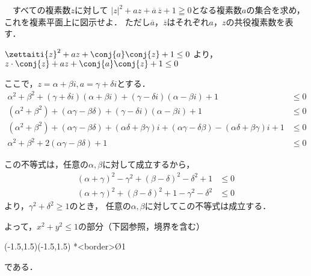 \begin{problem}
  　すべての複素数$z$に対して
${|z|}^2+az+\overline{a}\,\overline{z}+1\geqq0$となる複素数$a$の集合を求め，
これを複素平面上に図示せよ．
ただし$\overline{a}$，$\overline{z}$はそれぞれ$a$，$z$の共役複素数を表す．
\end{problem}

$\zettaiti{z}^2 + az + \conj{a}\conj{z} + 1 \leq 0$ より，
$z\cdot \conj{z} + az + \conj{a}\conj{z} + 1 \leq 0$

ここで，$z = \alpha + \beta i, a = \gamma + \delta i$とする．
\begin{align*}
  \alpha^2 + \beta^2 + (\gamma + \delta i)(\alpha + \beta i) + (\gamma - \delta i)(\alpha - \beta i) + 1 &\leq 0 \\
  (\alpha^2 + \beta^2) + (\alpha\gamma-\beta\delta) + (\gamma-\delta i)(\alpha - \beta i) + 1 &\leq 0 \\
  (\alpha^2 + \beta^2) + (\alpha\gamma-\beta\delta) + (\alpha\delta + \beta\gamma)i + (\alpha\gamma - \delta\beta) - (\alpha\delta + \beta\gamma)i + 1 &\leq 0 \\
  \alpha^2 + \beta^2 + 2(\alpha\gamma - \beta\delta) + 1 &\leq 0
\end{align*}

この不等式は，任意の$\alpha,\beta$に対して成立するから，
\begin{align*}
  (\alpha + \gamma)^2 - \gamma^2 + (\beta - \delta)^2 - \delta^2 + 1 &\leq 0 \\
  (\alpha + \gamma)^2 + (\beta-\delta)^2 + 1 -\gamma^2 - \delta^2 &\leq 0
\end{align*}
より，$\gamma^2 + \delta^2 \geq 1$のとき，
任意の$\alpha, \beta$に対してこの不等式は成立する．

よって，$x^2 + y^2 \leq 1$の部分（下図参照，境界を含む）
\begin{center}
  \begin{pszahyou}[ul=20mm](-1.5,1.5)(-1.5,1.5)
    \En**<border>\O{1}
  \end{pszahyou}
\end{center}
である．
